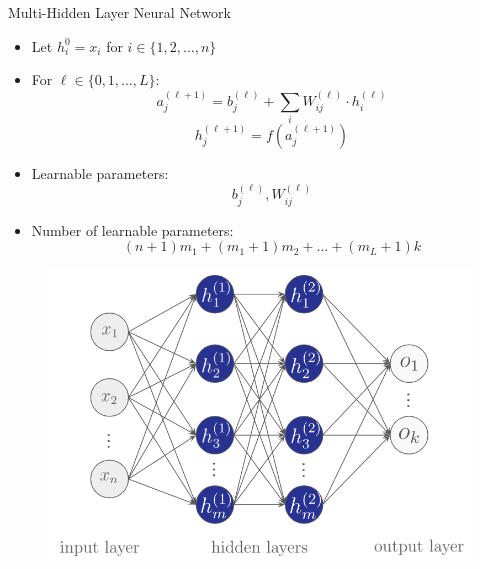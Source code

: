 \documentclass[serif, aspectratio=169]{beamer}
\begin{document}
\begin{frame}{Multi-Hidden Layer Neural Network}
    \begin{itemize}
        \item Let $h^0_i = x_i$ for $i \in \{1, 2, \ldots, n  \}$
        \item For $\ell \in \{0, 1, \ldots, L \}$:
        $$a^{(\ell+1)}_j = b^{(\ell)}_j + \sum_i W^{(\ell)}_{ij}\cdot h^{(\ell)}_i$$
        $$h^{(\ell+1)}_j = f(a^{(\ell+1)}_j)$$

        \item Learnable parameters:
        $$b^{(\ell)}_j, W^{(\ell)}_{ij}$$

        \item Number of learnable parameters:
        $$(n+1)m_1 + (m_1 + 1)m_2 + ... + (m_L + 1)k$$
    \end{itemize}
    \endminipage
    \hfill
        \begin{figure}[bh]
            \includegraphics[width=\linewidth]{pic/2/multi-hidden-nn.png}
        \end{figure}
    \endminipage
\end{frame}
\end{document}
